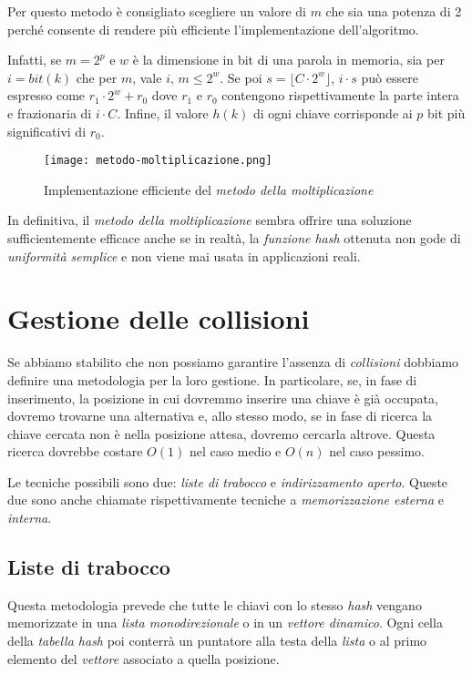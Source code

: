 \bigskip\noindent
Per questo metodo è consigliato scegliere un valore di $m$ che sia una potenza
di 2 perché consente di rendere più efficiente l'implementazione dell'algoritmo.

Infatti, se $m=2^p$ e $w$ è la dimensione in bit di una parola in memoria, sia
per $i=bit(k)$ che per $m$, vale $i,\,m\leq2^w$. Se poi $s=\lfloor C\cdot2^w\rfloor$,
$i\cdot s$ può essere espresso come $r_1\cdot2^w+r_0$ dove $r_1$ e $r_0$
contengono rispettivamente la parte intera e frazionaria di $i\cdot C$.
Infine, il valore $h(k)$ di ogni chiave corrisponde ai $p$ bit più significativi
di $r_0$.

\begin{figure}[h!]
    \centering
    \texttt{[image: metodo-moltiplicazione.png]}
    \caption{Implementazione efficiente del \emph{metodo della moltiplicazione}}
\end{figure}\noindent
In definitiva, il \emph{metodo della moltiplicazione} sembra offrire una soluzione
sufficientemente efficace anche se in realtà, la \emph{funzione hash} ottenuta non
gode di \emph{uniformità semplice} e non viene mai usata in applicazioni reali.

\section{Gestione delle collisioni}
Se abbiamo stabilito che non possiamo garantire l'assenza di \emph{collisioni}
dobbiamo definire una metodologia per la loro gestione. In particolare, se,
in fase di inserimento, la posizione in cui dovremmo inserire una chiave è
già occupata, dovremo trovarne una alternativa e, allo stesso modo, se in fase di
ricerca la chiave cercata non è nella posizione attesa, dovremo cercarla
altrove. Questa ricerca dovrebbe costare $O(1)$ nel caso medio e $O(n)$ nel caso
pessimo.

Le tecniche possibili sono due: \emph{liste di trabocco} e \emph{indirizzamento
aperto}. Queste due sono anche chiamate rispettivamente tecniche a
\emph{memorizzazione esterna} e \emph{interna}.

\subsection{Liste di trabocco}
Questa metodologia prevede che tutte le chiavi con lo stesso \emph{hash}
vengano memorizzate in una \emph{lista monodirezionale} o in un \emph{vettore
dinamico}. Ogni cella della \emph{tabella hash} poi conterrà un puntatore alla
testa della \emph{lista} o al primo elemento del \emph{vettore} associato a quella
posizione.

